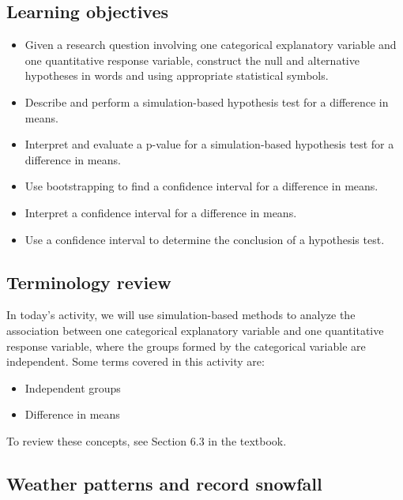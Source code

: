 \documentclass[
]{report}
\begin{document}

\hypertarget{learning-objectives-19}{%
\subsection{Learning objectives}\label{learning-objectives-19}}

\begin{itemize}
\item
  Given a research question involving one categorical explanatory variable and one quantitative response variable, construct the null and alternative hypotheses
  in words and using appropriate statistical symbols.
\item
  Describe and perform a simulation-based hypothesis test for a difference in means.
\item
  Interpret and evaluate a p-value for a simulation-based hypothesis test for a difference in means.
\item
  Use bootstrapping to find a confidence interval for a difference in means.
\item
  Interpret a confidence interval for a difference in means.
\item
  Use a confidence interval to determine the conclusion of a hypothesis test.
\end{itemize}

\hypertarget{terminology-review-21}{%
\subsection{Terminology review}\label{terminology-review-21}}

In today's activity, we will use simulation-based methods to analyze the association between one categorical explanatory variable and one quantitative response variable, where the groups formed by the categorical variable are independent. Some terms covered in this activity are:

\begin{itemize}
\item
  Independent groups
\item
  Difference in means
\end{itemize}

To review these concepts, see Section 6.3 in the textbook.

\hypertarget{weather-patterns-and-record-snowfall}{%
\subsection{Weather patterns and record snowfall}\label{weather-patterns-and-record-snowfall}}
\end{document}
